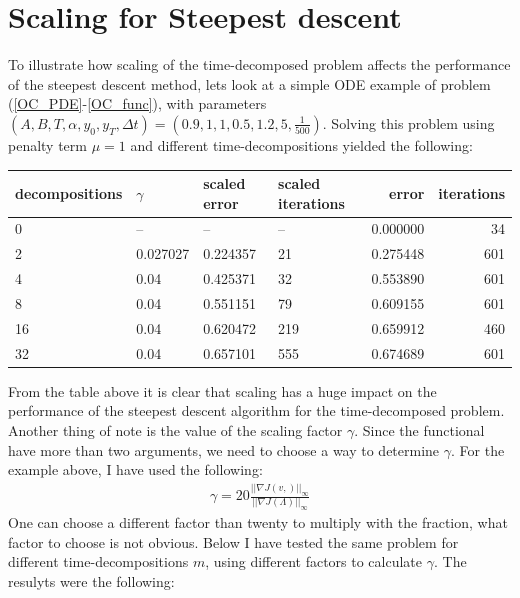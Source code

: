 \documentclass[11pt,a4paper]{article}
\begin{document}
\section{Scaling for Steepest descent}
To illustrate how scaling of the time-decomposed problem affects the performance of the steepest descent method, lets look at a simple ODE example of problem (\ref{OC_PDE}-\ref{OC_func}), with parameters $(A,B,T,\alpha,y_0,y_T,\Delta t)=(0.9,1,1,0.5,1.2,5,\frac{1}{500})$. Solving this problem using penalty term $\mu=1$ and different time-decompositions yielded the following:
\\
\begin{tabular}{llllrr}
\toprule
{}decompositions &     $\gamma$ & scaled error & scaled iterations &  error &  iterations \\
\midrule
0  &        -- &           -- &                -- &        0.000000 &                   34 \\
2  &  0.027027 &     0.224357 &                21 &        0.275448 &                  601 \\
4  &      0.04 &     0.425371 &                32 &        0.553890 &                  601 \\
8  &      0.04 &     0.551151 &                79 &        0.609155 &                  601 \\
16 &      0.04 &     0.620472 &               219 &        0.659912 &                  460 \\
32 &      0.04 &     0.657101 &               555 &        0.674689 &                  601 \\
\bottomrule
\end{tabular}
From the table above it is clear that scaling has a huge impact on the performance of the steepest descent algorithm for the time-decomposed problem. Another thing of note is the value of the scaling factor $\gamma$. Since the functional have more than two arguments, we need to choose a way to determine $\gamma$. For the example above, I have used the following:
\begin{align*}
\gamma = 20\frac{||\nabla J(v,)||_{\infty}}{||\nabla J(\Lambda)||_{\infty}}
\end{align*} 
One can choose a different factor than twenty to multiply with the fraction, what factor to choose is not obvious. Below I have tested the same problem for different time-decompositions $m$, using different factors to calculate $\gamma$. The resulyts were the following:
\\
\end{document}
